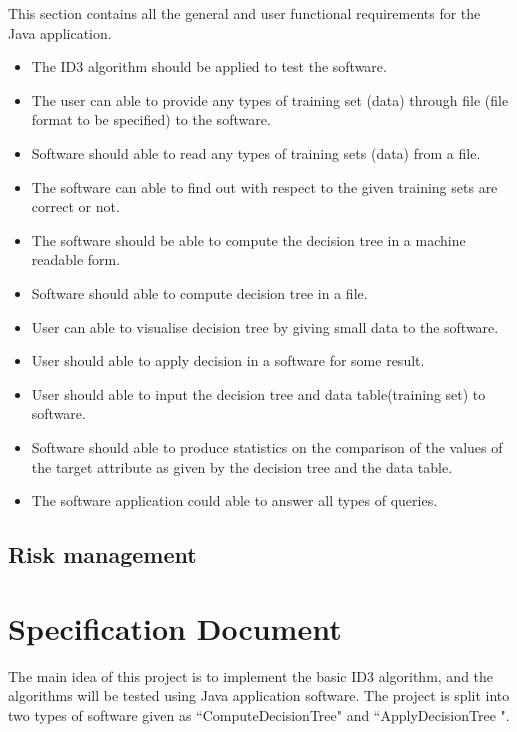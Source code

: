 \documentclass{report}
\begin{document}
This section contains all the general and user functional requirements for the Java application. 
\begin{itemize}
\item The ID3 algorithm should be applied to test the software.
\item The user can able to provide any types of training set (data) through file (file format to be specified) to the software.
\item Software should able to read any types of training sets (data) from a file.
\item The software can able to find out with respect to the given training sets are correct or not. 
\item The software should be able to compute the decision tree in a machine readable form.
\item Software should able to compute decision tree in a file.
\item User can able to visualise decision tree by giving small data to the software.
\item User should able to apply decision in a software for some result.
\item User should able to input the decision tree and data table(training set) to software.
\item Software should able to produce statistics on the comparison of the values of the target attribute as given by the decision tree and the data table.
\item The software application could able to answer all types of queries.

\end{itemize}


\section{Risk management}
\label{sec:riskman}




\chapter{Specification Document}
\label{cha:specdoc}

The main idea of this project is to implement the basic ID3 algorithm, and the algorithms will be tested using Java application software. The project is split into two types of software given as ``ComputeDecisionTree" and ``ApplyDecisionTree ". 
\end{document}
